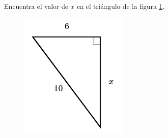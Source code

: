 Encuentra el valor de $x$ en el triángulo de la figura \ref{fig:lados_pitagoras_22}.

\begin{minipage}[t][][t]{0.35\textwidth}
    \begin{figure}[H]
        \centering
        \includegraphics[width=0.9\linewidth]{../images/lados_pitagoras_22.png}

        \caption{}
        \label{fig:lados_pitagoras_22}
    \end{figure}
\end{minipage}\hfill
